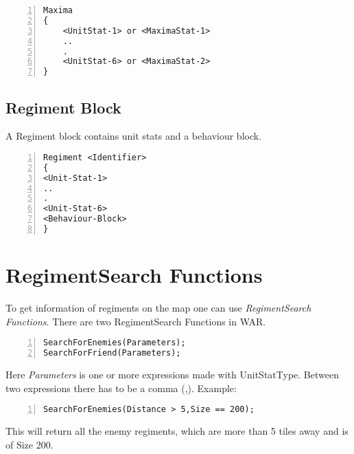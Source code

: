 		\begin{lstlisting}[basicstyle=\small\sffamily,
		keywordstyle={\color{blue}},
		comment={[l]{//}}, morecomment={[s]{/*}{*/}}, commentstyle=\itshape,
		columns={[l]flexible}, numbers=left, numberstyle=\tiny,
		frameround=fftt, frame=shadowbox, captionpos=b,
		caption={Maxima stat}]
Maxima
{
	<UnitStat-1> or <MaximaStat-1>
	..
	.
	<UnitStat-6> or <MaximaStat-2>
}
		\end{lstlisting}
	\subsection{Regiment Block}
		A Regiment block contains unit stats and a behaviour block.

		\begin{lstlisting}[basicstyle=\small\sffamily,
		keywordstyle={\color{blue}},
		comment={[l]{//}}, morecomment={[s]{/*}{*/}}, commentstyle=\itshape,
		columns={[l]flexible}, numbers=left, numberstyle=\tiny,
		frameround=fftt, frame=shadowbox, captionpos=b,
		caption={Regiment block}]
Regiment <Identifier>
{
<Unit-Stat-1>
..
.
<Unit-Stat-6>
<Behaviour-Block>
}
		\end{lstlisting}
\section{RegimentSearch Functions}
	To get information of regiments on the map one can use {\it RegimentSearch Functions}. There are two RegimentSearch Functions in WAR.\\

		\begin{lstlisting}[basicstyle=\small\sffamily,
		keywordstyle={\color{blue}},
		comment={[l]{//}}, morecomment={[s]{/*}{*/}}, commentstyle=\itshape,
		columns={[l]flexible}, numbers=left, numberstyle=\tiny,
		frameround=fftt, frame=shadowbox, captionpos=b,
		caption={RegimentSearch Functions}]
SearchForEnemies(Parameters);
SearchForFriend(Parameters);
	\end{lstlisting}
	Here {\it Parameters} is one or more expressions made with UnitStatType. Between two expressions there has to be a comma (,).
	Example: \\

		\begin{lstlisting}[basicstyle=\small\sffamily,
		keywordstyle={\color{blue}},
		comment={[l]{//}}, morecomment={[s]{/*}{*/}}, commentstyle=\itshape,
		columns={[l]flexible}, numbers=left, numberstyle=\tiny,
		frameround=fftt, frame=shadowbox, captionpos=b,
		caption={Functions with parameters}]
SearchForEnemies(Distance > 5,Size == 200);
	\end{lstlisting}
	This will return all the enemy regiments, which are more than 5 tiles away and is of Size 200.		
